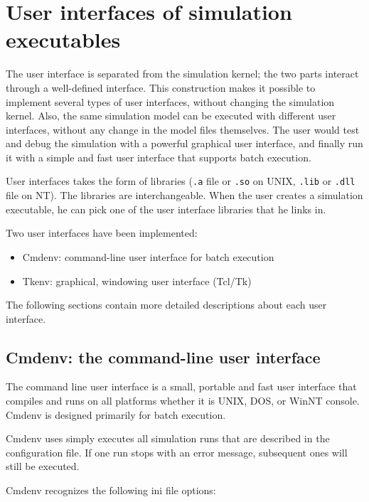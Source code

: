 \section{User interfaces of simulation executables}

The user interface is separated from the
simulation kernel; the two parts interact through a well-defined
interface. This construction makes it possible to implement several
types of user interfaces, without changing the simulation kernel.
Also, the same simulation model can be executed with different user
interfaces, without any change in the model files themselves. The user
would test and debug the simulation with a powerful graphical user
interface, and finally run it with a simple and fast user interface
that supports batch execution.


User interfaces takes the form of libraries (\texttt{.a} file or
\texttt{.so} on UNIX, \texttt{.lib} or \texttt{.dll} file on NT). The
libraries are interchangeable. When the user creates a simulation
executable, he can pick one of the user interface libraries that he
links in.


Two user interfaces have been implemented:
\begin{itemize}
\item{Cmdenv: command-line user interface for batch execution}
\item{Tkenv: graphical, windowing user interface (Tcl/Tk)}
\end{itemize}

The following sections contain more detailed descriptions about 
each user interface.





\subsection{Cmdenv: the command-line user interface}

The command line user interface is
a small, portable and fast user interface that compiles and runs on
all platforms whether it is UNIX, DOS, or WinNT console.
Cmdenv is designed primarily for batch execution.

Cmdenv uses simply executes all simulation runs that are described 
in the configuration file. If one run stops with an error message, 
subsequent ones will still be executed.


Cmdenv recognizes the following ini file options:

